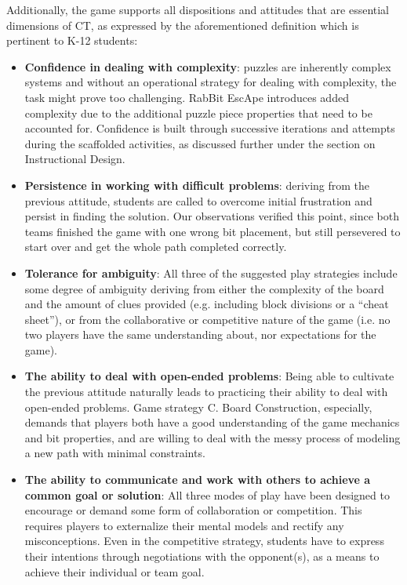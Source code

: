 \documentclass{acm_proc_article-sp}
\begin{document}
Additionally, the game supports all dispositions and attitudes that are essential dimensions of CT, as expressed by the aforementioned definition which is pertinent to K-12 students:
\begin{itemize}
       \item \textbf{Confidence in dealing with complexity}:
       puzzles are inherently complex systems and without an operational strategy for dealing with complexity, the task might prove too challenging.
       RabBit EscApe introduces added complexity due to the additional puzzle piece properties that need to be accounted for.
       Confidence is built through successive iterations and attempts during the scaffolded activities, as discussed further under the section on Instructional Design.
       \item \textbf{Persistence in working with difficult problems}:
       deriving from the previous attitude, students are called to overcome initial frustration and persist in finding the solution. Our observations verified this point, since both teams finished the game with one wrong bit placement, but still persevered to start over and get the whole path completed correctly.
       \item \textbf{Tolerance for ambiguity}: 
       All three of the suggested play strategies include some degree of ambiguity deriving from either the complexity of the board and the amount of clues provided (e.g. including block divisions or a “cheat sheet”), or from the collaborative or competitive nature of the game (i.e. no two  players have the same understanding about, nor expectations for the game). 
       \item \textbf{The ability to deal with open-ended problems}: Being able to cultivate the previous attitude naturally leads to practicing their ability to deal with open-ended problems. Game strategy C. Board Construction, especially, demands that players both have a good understanding of the game mechanics and bit properties, and are willing to deal with the messy process of modeling a new path with minimal constraints.
       \item \textbf{The ability to communicate and work with others to achieve a common goal or solution}:
       All three modes of play have been designed to encourage or demand some form of collaboration or competition.
       This requires players to externalize their mental models and rectify any misconceptions.
       Even in the competitive strategy, students have to express their intentions through negotiations with the opponent(s), as a means to achieve their individual or team goal.
\end{itemize}
\end{document}

